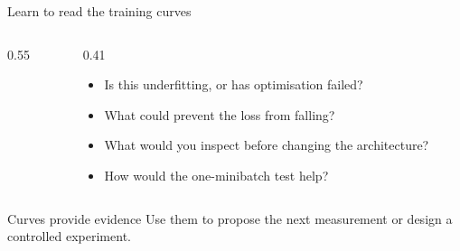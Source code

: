 
\begin{frame}{Learn to read the training curves}
\begin{columns}[T]
\begin{column}{0.55\textwidth}
\centering
{}
\end{column}
\begin{column}{0.41\textwidth}
\begin{itemize}
  \item Is this underfitting, or has optimisation failed?
  \item What could prevent the loss from falling?
  \item What would you inspect before changing the architecture?
  \item How would the one-minibatch test help?
\end{itemize}
\end{column}
\end{columns}

\begin{block}{Curves provide evidence}
Use them to propose the next measurement or design a controlled experiment.
\end{block}
\end{frame}


